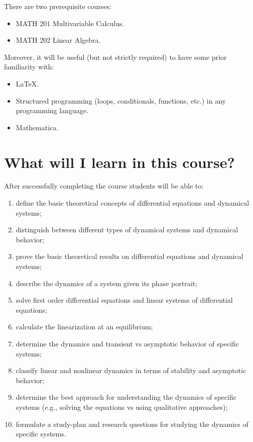 \documentclass[11pt]{article}
\begin{document}
There are two prerequisite courses:
\begin{itemize}[label={-},noitemsep]
\item MATH 201 Multivariable Calculus.
\item MATH 202 Linear Algebra.
\end{itemize}

Moreover, it will be useful (but not strictly required) to have some prior familiarity with:
\begin{itemize}[label={-},noitemsep]
\item LaTeX.
\item Structured programming (loops, conditionals, functions, etc.) in any programming language.
\item Mathematica.
\end{itemize}


\section{What will I learn in this course?}

After successfully completing the course students will be able to:

\begin{enumerate}[label={\arabic*.},noitemsep]
\item define the basic theoretical concepts of differential equations and dynamical systems;
\item distinguish between different types of dynamical systems and dynamical behavior;
\item prove the basic theoretical results on differential equations and dynamical systems;
\item describe the dynamics of a system given its phase portrait;
\item solve first order differential equations and linear systems of differential equations;
\item calculate the linearization at an equilibrium;
\item determine the dynamics and transient vs asymptotic behavior of specific systems;
\item classify linear and nonlinear dynamics in terms of stability and asymptotic behavior;
\item determine the best approach for understanding the dynamics of specific systems (e.g., solving the equations vs using qualitative approaches);
\item formulate a study-plan and research questions for studying the dynamics of specific systems.
\end{enumerate}
\end{document}
